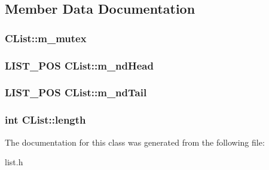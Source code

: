\subsection{Member Data Documentation}
\hypertarget{class_c_list_a76347b2a51428a724cc7698074e08639}{
\subsubsection[{m\-\_\-mutex}]{ C\-List\-::m\-\_\-mutex\hspace{0.3cm}{\ttfamily [protected]}}}\label{class_c_list_a76347b2a51428a724cc7698074e08639}
\hypertarget{class_c_list_a3ffa4c25b7b0604451366791aede5af7}{
\subsubsection[{m\-\_\-nd\-Head}]{\setlength{\rightskip}{0pt plus 5cm}L\-I\-S\-T\-\_\-\-P\-O\-S C\-List\-::m\-\_\-nd\-Head\hspace{0.3cm}{\ttfamily [protected]}}}\label{class_c_list_a3ffa4c25b7b0604451366791aede5af7}
\hypertarget{class_c_list_aeeb0d3cb327800216a8f0fa112efa8d6}{
\subsubsection[{m\-\_\-nd\-Tail}]{\setlength{\rightskip}{0pt plus 5cm}L\-I\-S\-T\-\_\-\-P\-O\-S C\-List\-::m\-\_\-nd\-Tail\hspace{0.3cm}{\ttfamily [protected]}}}\label{class_c_list_aeeb0d3cb327800216a8f0fa112efa8d6}
\hypertarget{class_c_list_adb228ed98190b1f57080840440f2eb2b}{
\subsubsection[{length}]{\setlength{\rightskip}{0pt plus 5cm}int C\-List\-::length\hspace{0.3cm}{\ttfamily [protected]}}}\label{class_c_list_adb228ed98190b1f57080840440f2eb2b}


The documentation for this class was generated from the following file\-:\begin{DoxyCompactItemize}
\item 
list.\-h\end{DoxyCompactItemize}
